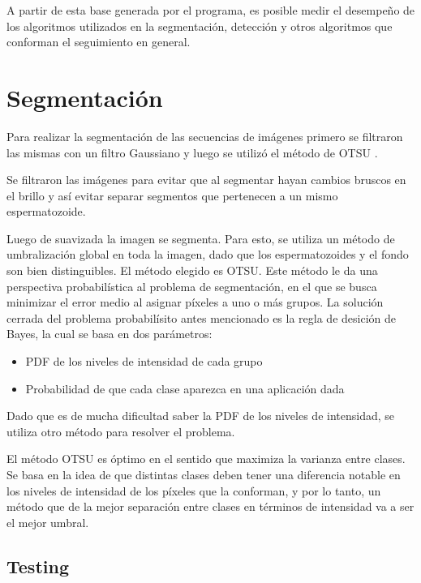 A partir de esta base generada por el programa, es posible medir el desempeño de los algoritmos utilizados en la segmentación, detección y otros algoritmos que conforman el seguimiento en general.


\section{Segmentación}

Para realizar la segmentación de las secuencias de imágenes primero se filtraron las mismas con un filtro Gaussiano y luego se utilizó el método de OTSU \cite{libroTimag}. 


Se filtraron las imágenes para evitar que al segmentar hayan cambios bruscos en el brillo y así evitar separar segmentos que pertenecen a un mismo espermatozoide. 

Luego de suavizada la imagen se segmenta. Para esto, se utiliza un método de umbralización global en toda la imagen, dado que los espermatozoides y el fondo son bien distinguibles. El método elegido es OTSU. Este método le da una perspectiva probabilística al problema de segmentación, en el que se busca minimizar el error medio al asignar píxeles a uno o más grupos. La solución cerrada del problema probabilísito antes mencionado es la regla de desición de Bayes, la cual se basa en dos parámetros:
\begin{itemize}
    \item PDF de los niveles de intensidad de cada grupo
    \item Probabilidad de que cada clase aparezca en una aplicación dada 
\end{itemize}


Dado que es de mucha dificultad saber la PDF de los niveles de intensidad, se utiliza otro método para resolver el problema. 


El método OTSU es óptimo en el sentido que maximiza la varianza entre clases. Se basa en la idea de que distintas clases deben tener una diferencia notable en los niveles de intensidad de los píxeles que la conforman, y por lo tanto, un método que de la mejor separación entre clases en términos de intensidad va a ser el mejor umbral. 

\subsection{Testing}

